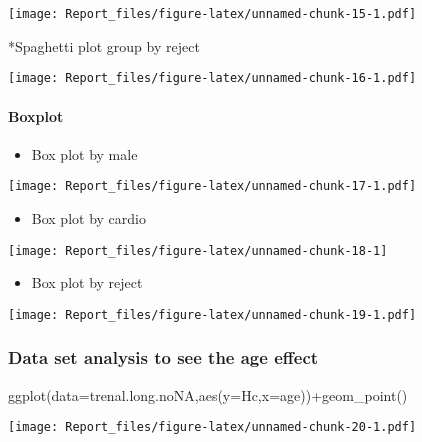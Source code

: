 \documentclass[
]{article}
\newenvironment{Shaded}{\begin{snugshade}}{\end{snugshade}}
\newcommand{\AttributeTok}[1]{\textcolor[rgb]{0.77,0.63,0.00}{#1}}
\newcommand{\FunctionTok}[1]{\textcolor[rgb]{0.00,0.00,0.00}{#1}}
\newcommand{\NormalTok}[1]{#1}
\newcommand{\SpecialCharTok}[1]{\textcolor[rgb]{0.00,0.00,0.00}{#1}}
\providecommand{\tightlist}{%
  \setlength{\itemsep}{0pt}\setlength{\parskip}{0pt}}
\begin{document}
\texttt{[image: Report\_files/figure-latex/unnamed-chunk-15-1.pdf]}

*Spaghetti plot group by reject

\texttt{[image: Report\_files/figure-latex/unnamed-chunk-16-1.pdf]}

\hypertarget{boxplot}{%
\paragraph{Boxplot}\label{boxplot}}

\begin{itemize}
\tightlist
\item
  Box plot by male
\end{itemize}

\texttt{[image: Report\_files/figure-latex/unnamed-chunk-17-1.pdf]}

\begin{itemize}
\tightlist
\item
  Box plot by cardio
\end{itemize}

\begin{center}\texttt{[image: Report\_files/figure-latex/unnamed-chunk-18-1]} \end{center}

\begin{itemize}
\tightlist
\item
  Box plot by reject
\end{itemize}

\texttt{[image: Report\_files/figure-latex/unnamed-chunk-19-1.pdf]}

\hypertarget{data-set-analysis-to-see-the-age-effect}{%
\subsubsection{Data set analysis to see the age
effect}\label{data-set-analysis-to-see-the-age-effect}}

\begin{Shaded}
\begin{Highlighting}[]
\FunctionTok{ggplot}\NormalTok{(}\AttributeTok{data=}\NormalTok{trenal.long.noNA,}\FunctionTok{aes}\NormalTok{(}\AttributeTok{y=}\NormalTok{Hc,}\AttributeTok{x=}\NormalTok{age))}\SpecialCharTok{+}\FunctionTok{geom\_point}\NormalTok{()}
\end{Highlighting}
\end{Shaded}

\texttt{[image: Report\_files/figure-latex/unnamed-chunk-20-1.pdf]}
\end{document}
